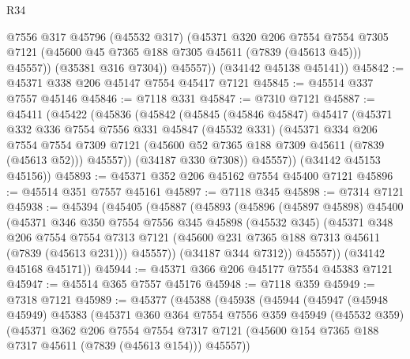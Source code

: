 \begin{lexlean}{R34}
\begin{coremodule}
              @7556
              @317
              @45796
              (@45532 @317)
              (@45371
                @320
                @206
                @7554
                @7554
                @7305
                @7121
                (@45600 @45 @7365 @188 @7305 @45611 (@7839 (@45613 @45)))
                @45557))
            (@35381 @316 @7304))
          @45557))
      (@34142 @45138 @45141))
@45842 := @45371 @338 @206 @45147 @7554 @45417 @7121
@45845 := @45514 @337 @7557 @45146
@45846 := @7118 @331
@45847 := @7310 @7121
@45887 := @45411
    (@45422
      (@45836
        (@45842
          (@45845
            (@45846 @45847)
            @45417
            (@45371
              @332
              @336
              @7554
              @7556
              @331
              @45847
              (@45532 @331)
              (@45371
                @334
                @206
                @7554
                @7554
                @7309
                @7121
                (@45600 @52 @7365 @188 @7309 @45611 (@7839 (@45613 @52)))
                @45557))
            (@34187 @330 @7308))
          @45557))
      (@34142 @45153 @45156))
@45893 := @45371 @352 @206 @45162 @7554 @45400 @7121
@45896 := @45514 @351 @7557 @45161
@45897 := @7118 @345
@45898 := @7314 @7121
@45938 := @45394
    (@45405
      (@45887
        (@45893
          (@45896
            (@45897 @45898)
            @45400
            (@45371
              @346
              @350
              @7554
              @7556
              @345
              @45898
              (@45532 @345)
              (@45371
                @348
                @206
                @7554
                @7554
                @7313
                @7121
                (@45600 @231 @7365 @188 @7313 @45611 (@7839 (@45613 @231)))
                @45557))
            (@34187 @344 @7312))
          @45557))
      (@34142 @45168 @45171))
@45944 := @45371 @366 @206 @45177 @7554 @45383 @7121
@45947 := @45514 @365 @7557 @45176
@45948 := @7118 @359
@45949 := @7318 @7121
@45989 := @45377
    (@45388
      (@45938
        (@45944
          (@45947
            (@45948 @45949)
            @45383
            (@45371
              @360
              @364
              @7554
              @7556
              @359
              @45949
              (@45532 @359)
              (@45371
                @362
                @206
                @7554
                @7554
                @7317
                @7121
                (@45600 @154 @7365 @188 @7317 @45611 (@7839 (@45613 @154)))
                @45557))

\end{coremodule}
\end{lexlean}

